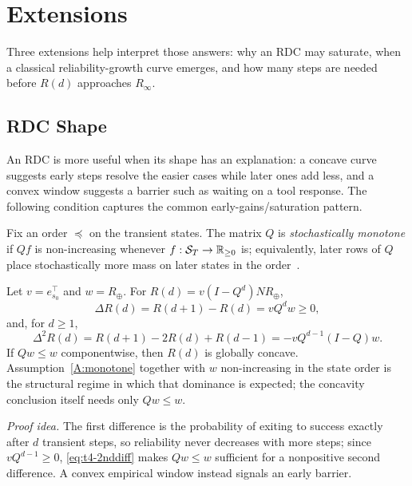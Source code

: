 \section{Extensions}
\label{sec:ext}

Three extensions help interpret those answers: why an RDC may
saturate, when a classical reliability-growth curve emerges, and how
many steps are needed before $R(d)$ approaches $R_\infty$.

\subsection{RDC Shape}

An RDC is more useful when its shape has an explanation: a concave
curve suggests early steps resolve the easier cases while later ones
add less, and a convex window suggests a barrier such as waiting on a
tool response. The following condition captures the common
early-gains/saturation pattern.

\begin{assumption}\label{A:monotone}
Fix an order $\preceq$ on the transient states. The matrix $Q$ is
\emph{stochastically monotone} if $Qf$ is non-increasing whenever
$f:\mathcal{S}_T\to\mathbb{R}_{\ge0}$ is; equivalently, later rows of $Q$ place
stochastically more mass on later states in the
order~\cite{daley1968stochastic,karlin1968tp,keilsonKester1977}.
\end{assumption}

\begin{proposition}
\label{thm:shape}
Let $v=e_{s_0}^{\top}$ and $w=R_\oplus$. For
$R(d)=v(I-Q^d)NR_\oplus$,
\begin{equation}
\Delta R(d)=R(d+1)-R(d)=vQ^dw\ge0,
\label{eq:t4-1stdiff}
\end{equation}
and, for $d\ge1$,
\begin{equation}
\Delta^2R(d)=R(d+1)-2R(d)+R(d-1)
           =-vQ^{d-1}(I-Q)w.
\label{eq:t4-2nddiff}
\end{equation}
If $Qw\le w$ componentwise, then $R(d)$ is globally concave.
Assumption~\ref{A:monotone} together with $w$ non-increasing in the
state order is the structural regime in which that dominance is
expected; the concavity conclusion itself needs only $Qw\le w$.
\end{proposition}

\noindent\emph{Proof idea.}
The first difference is the probability of exiting to success exactly
after $d$ transient steps, so reliability never decreases with more
steps; since $vQ^{d-1}\ge0$, \eqref{eq:t4-2nddiff} makes $Qw\le w$
sufficient for a nonpositive second difference. A convex empirical
window instead signals an early barrier.

